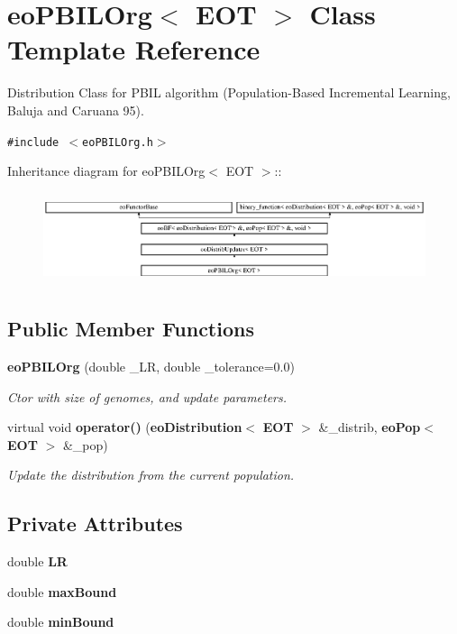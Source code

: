 \section{eo\-PBILOrg$<$ EOT $>$ Class Template Reference}
\label{classeo_p_b_i_l_org}
Distribution Class for PBIL algorithm (Population-Based Incremental Learning, Baluja and Caruana 95).  


{\tt \#include $<$eo\-PBILOrg.h$>$}

Inheritance diagram for eo\-PBILOrg$<$ EOT $>$::\begin{figure}[H]
\begin{center}
\leavevmode
\includegraphics[height=2.71186cm]{classeo_p_b_i_l_org}
\end{center}
\end{figure}
\subsection*{Public Member Functions}
\begin{CompactItemize}
\item 
{\bf eo\-PBILOrg} (double \_\-LR, double \_\-tolerance=0.0)\label{classeo_p_b_i_l_org_a0}

\begin{CompactList}\small\item\em Ctor with size of genomes, and update parameters. \item\end{CompactList}\item 
virtual void {\bf operator()} ({\bf eo\-Distribution}$<$ {\bf EOT} $>$ \&\_\-distrib, {\bf eo\-Pop}$<$ {\bf EOT} $>$ \&\_\-pop)\label{classeo_p_b_i_l_org_a1}

\begin{CompactList}\small\item\em Update the distribution from the current population. \item\end{CompactList}\end{CompactItemize}
\subsection*{Private Attributes}
\begin{CompactItemize}
\item 
double {\bf LR}\label{classeo_p_b_i_l_org_r0}

\item 
double {\bf max\-Bound}\label{classeo_p_b_i_l_org_r1}

\item 
double {\bf min\-Bound}\label{classeo_p_b_i_l_org_r2}

\end{CompactItemize}


